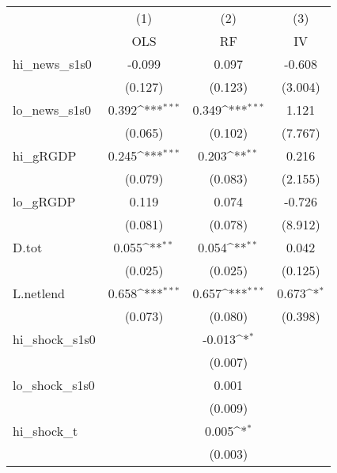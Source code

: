 {
\def\sym#1{\ifmmode^{#1}\else\(^{#1}\)\fi}
\begin{tabular}{l*{3}{c}}
\toprule
            &\multicolumn{1}{c}{(1)}&\multicolumn{1}{c}{(2)}&\multicolumn{1}{c}{(3)}\\
            &\multicolumn{1}{c}{OLS}&\multicolumn{1}{c}{RF}&\multicolumn{1}{c}{IV}\\
\midrule
hi\_news\_s1s0&      -0.099         &       0.097         &      -0.608         \\
            &     (0.127)         &     (0.123)         &     (3.004)         \\
\addlinespace
lo\_news\_s1s0&       0.392\sym{***}&       0.349\sym{***}&       1.121         \\
            &     (0.065)         &     (0.102)         &     (7.767)         \\
\addlinespace
hi\_gRGDP    &       0.245\sym{***}&       0.203\sym{**} &       0.216         \\
            &     (0.079)         &     (0.083)         &     (2.155)         \\
\addlinespace
lo\_gRGDP    &       0.119         &       0.074         &      -0.726         \\
            &     (0.081)         &     (0.078)         &     (8.912)         \\
\addlinespace
D.tot       &       0.055\sym{**} &       0.054\sym{**} &       0.042         \\
            &     (0.025)         &     (0.025)         &     (0.125)         \\
\addlinespace
L.netlend   &       0.658\sym{***}&       0.657\sym{***}&       0.673\sym{*}  \\
            &     (0.073)         &     (0.080)         &     (0.398)         \\
\addlinespace
hi\_shock\_s1s0&                     &      -0.013\sym{*}  &                     \\
            &                     &     (0.007)         &                     \\
\addlinespace
lo\_shock\_s1s0&                     &       0.001         &                     \\
            &                     &     (0.009)         &                     \\
\addlinespace
hi\_shock\_t  &                     &       0.005\sym{*}  &                     \\
            &                     &     (0.003)         &                     \\

\end{tabular}}
